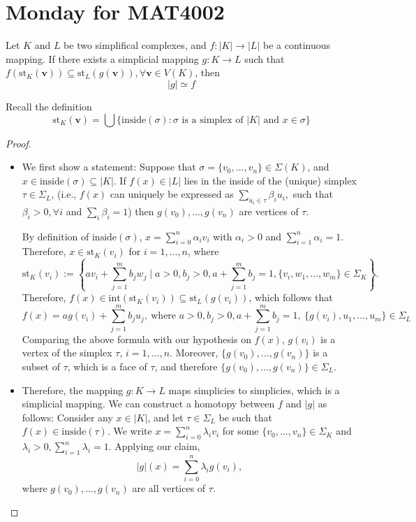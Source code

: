\section{Monday for MAT4002}
\begin{proposition}\label{pro:10:6}
Let $K$ and $L$ be two simplifical complexes, and $f:|K|\to|L|$ be a continuous mapping. If there exists a simplicial mapping $g:K\to L$ such that $f(\text{st}_K(\bm v))\subseteq\text{st}_L(g(\bm v)),\forall \bm v\in V(K)$, then 
\[
|g|\simeq f
\]
\end{proposition}
Recall the definition
\[
\text{st}_K(\bm v) = \bigcup\{\text{inside}(\sigma):\text{$\sigma$ is a simplex of $|K|$ and $x\in\sigma$}\}
\]
\begin{proof}
\begin{itemize}
\item
We first show a statement: Suppose that $\sigma=\{v_0,\dots,v_n\}\in\Sigma(K)$, and $x\in\text{inside}(\sigma)\subseteq|K|$. If $f(x)\in|L|$ lies in the inside of the (unique) simplex $\tau\in\Sigma_L$, (i.e., $f(x)$ can uniquely be expressed as $\sum_{u_i \in \tau} \beta_i u_i,$ such that $\beta_i > 0,\forall i$ and $\sum_i \beta_i = 1$) then $g(v_0),\dots,g(v_n)$ are vertices of $\tau$.

By definition of $\text{inside}(\sigma)$, $x=\sum_{i=0}^n\alpha_iv_i$ with $\alpha_i>0$ and $\sum_{i=1}^n\alpha_i=1$.
Therefore, $x\in\text{st}_K(v_i)$ for $i=1,\dots,n$, where
\[
\text{st}_K(v_i):=\left\{
av_i+\sum_{j=1}^mb_jw_j\mid a>0,b_j>0,a+\sum_{j=1}^mb_j=1,\{v_i,w_1,\dots,w_m\}\in\Sigma_K
\right\}.
\]
Therefore, $f(x)\in\text{int}(\text{st}_K(v_i))\subseteq\text{st}_L(g(v_i))$, which follows that
\[
f(x) = ag(v_i)+\sum_{j=1}^mb_ju_j, \ \text{where }a>0,b_j>0, a+\sum_{j=1}^mb_j=1,\ \{g(v_i),u_1,\dots,u_m\}\in\Sigma_L
\]
Comparing the above formula with our hypothesis on $f(x)$, $g(v_i)$ is a vertex of the simplex $\tau$, $i=1,\dots,n$.
Moreover, $\{g(v_0),\dots,g(v_n)\}$ is a subset of $\tau$, which is a face of $\tau$, and therefore $\{g(v_0),\dots,g(v_n)\}\in\Sigma_L$.
\item
Therefore, the mapping $g:K\to L$ maps simplicies to simplicies, which is a simplicial mapping.
We can construct a homotopy between $f$ and $|g|$ as follows:
Consider any $x\in|K|$, and let $\tau\in\Sigma_L$ be such that $f(x)\in\text{inside}(\tau)$.
We write $x=\sum_{i=0}^n\lambda_iv_i$ for some $\{v_0,\dots,v_n\}\in\Sigma_K$ and $\lambda_i>0,\sum_{i=1}^n\lambda_i=1$.
Applying our claim,
\[
|g|(x)=\sum_{i=0}^n\lambda_ig(v_i),
\]
where $g(v_0),\dots,g(v_n)$ are all vertices of $\tau$.


\end{itemize}
\end{proof}
